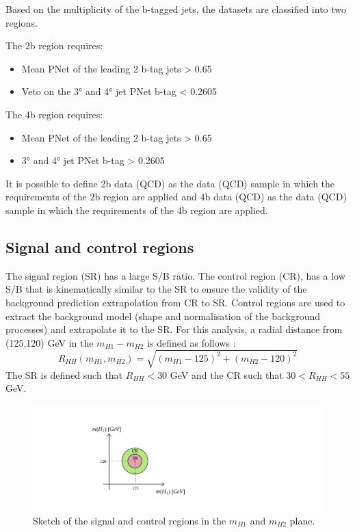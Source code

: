Based on the multiplicity of the b-tagged jets, the datasets are classified into two regions. 

\vspace{0.2 cm}

\noindent The 2b region requires:
\begin{itemize}
    \item Mean PNet of the leading 2 b-tag jets > 0.65
    \item Veto on the 3° and 4° jet PNet b-tag < 0.2605
\end{itemize}

\vspace{0.2 cm}

\noindent The 4b region requires:
\begin{itemize}
    \item Mean PNet of the leading 2 b-tag jets > 0.65
    \item 3° and 4° jet PNet b-tag > 0.2605
\end{itemize}

\vspace{0.2 cm}

\noindent It is possible to define 2b data (QCD) as the data (QCD) sample in which the requirements of the 2b region are applied and 4b data (QCD) as the data (QCD) sample in which the requirements of the 4b region are applied.

\subsection{Signal and control regions}

The signal region (SR)  has a large S/B ratio. The control region (CR), has a low S/B that is kinematically similar to the SR to ensure the validity of the background prediction extrapolation from CR to SR.  Control regions are used to extract the background model (shape and normalisation of the background processes) and extrapolate it to the SR. For this analysis, a radial distance from (125,120) GeV in the $m_{H1}-m_{H2}$ is defined as follows \cite{ANRun2}:
\begin{equation}
    R_{HH}(m_{H1}, m_{H2})=\sqrt{(m_{H1}-125)^2+(m_{H2}-120)^2}
\end{equation}
The SR is defined such that $R_{HH} < 30$ GeV and the CR such that $30 < R_{HH} < 55$ GeV.

\begin{figure}
    \centering
    \includegraphics[width=0.7\linewidth]{Images/4.HH4b Analysis/Higgs intro/CR - SR.pdf}
    \caption{Sketch of the signal and control regions in the $m_{H1}$ and $m_{H2}$ plane.}
    \label{fig:enter-label}
\end{figure}

